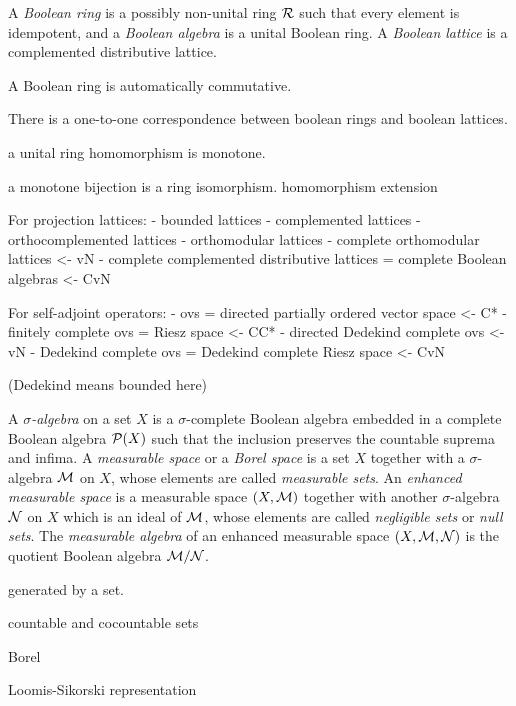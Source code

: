 \documentclass{../../large}
\begin{document}
\begin{prb}
A \emph{Boolean ring} is a possibly non-unital ring $\mathcal{R}$ such that every element is idempotent, and a \emph{Boolean algebra} is a unital Boolean ring.
A \emph{Boolean lattice} is a complemented distributive lattice.
\begin{parts}
\item A Boolean ring is automatically commutative.
\item There is a one-to-one correspondence between boolean rings and boolean lattices.
\item a unital ring homomorphism is monotone.
\item a monotone bijection is a ring isomorphism.
homomorphism extension
\end{parts}
\end{prb}


For projection lattices:
- bounded lattices
- complemented lattices
- orthocomplemented lattices
- orthomodular lattices
- complete orthomodular lattices <- vN
- complete complemented distributive lattices
	= complete Boolean algebras <- CvN

For self-adjoint operators:
- ovs = directed partially ordered vector space <- C*
- finitely complete ovs
	= Riesz space <- CC*
- directed Dedekind complete ovs <- vN
- Dedekind complete ovs
	= Dedekind complete Riesz space <- CvN



(Dedekind means bounded here)





\begin{prb}
A \emph{$\sigma$-algebra} on a set $X$ is a $\sigma$-complete Boolean algebra embedded in a complete Boolean algebra $\mathcal{P}(X)$ such that the inclusion preserves the countable suprema and infima.
A \emph{measurable space} or a \emph{Borel space} is a set $X$ together with a $\sigma$-algebra $\mathcal{M}$ on $X$, whose elements are called \emph{measurable sets}.
An \emph{enhanced measurable space} is a measurable space $(X,\mathcal{M})$ together with another $\sigma$-algebra $\mathcal{N}$ on $X$ which is an ideal of $\mathcal{M}$, whose elements are called \emph{negligible sets} or \emph{null sets}.
The \emph{measurable algebra} of an enhanced measurable space $(X,\mathcal{M},\mathcal{N})$ is the quotient Boolean algebra $\mathcal{M}/\mathcal{N}$.
\begin{parts}
\item generated by a set.
\item countable and cocountable sets
\item Borel
\item Loomis-Sikorski representation
\end{parts}
\end{prb}
\begin{pf}

\end{pf}
\end{document}
